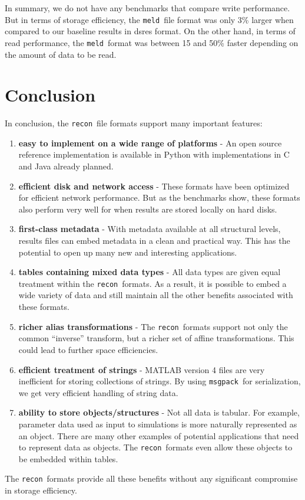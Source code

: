 \documentclass[11pt,a4paper,twocolumn]{article}
\newcommand{\recon}{\texttt{recon}}
\newcommand{\meld}{\texttt{meld}}
\newcommand{\msgpack}{\texttt{msgpack}}
\begin{document}
In summary, we do not have any benchmarks that compare write
performance.  But in terms of storage efficiency, the \meld\ file
format was only 3\% larger when compared to our baseline results in
dsres format.  On the other hand, in terms of read performance, the
\meld\ format was between 15 and 50\% faster depending on the amount
of data to be read.

\section{Conclusion}
\label{sec:conclusion}

In conclusion, the \recon\ file formats support many important features:
\begin{enumerate}
\item \textbf{easy to implement on a wide range of platforms} - An open
  source reference implementation is available in Python with
  implementations in C and Java already planned.
\item \textbf{efficient disk and network access} - These formats have been
  optimized for efficient network performance.  But as the benchmarks
  show, these formats also perform very well for when results are
  stored locally on hard disks.
\item \textbf{first-class metadata} - With metadata available at all
  structural levels, results files can embed metadata in a clean and
  practical way.  This has the potential to open up many new and
  interesting applications.
\item \textbf{tables containing mixed data types} - All data types are
  given equal treatment within the \recon\ formats.  As a result, it
  is possible to embed a wide variety of data and still maintain all
  the other benefits associated with these formats.
\item \textbf{richer alias transformations} - The \recon\ formats support
  not only the common ``inverse'' transform, but a richer set of
  affine transformations.  This could lead to further space
  efficiencies.
\item \textbf{efficient treatment of strings} - MATLAB version 4 files are
  very inefficient for storing collections of strings.  By using
  \msgpack\ for serialization, we get very efficient handling of
  string data.
\item \textbf{ability to store objects/structures} - Not all data is
  tabular.  For example, parameter data used as input to simulations
  is more naturally represented as an object.  There are many other
  examples of potential applications that need to represent data as
  objects.  The \recon\ formats even allow these objects to be
  embedded within tables.
\end{enumerate}

The \recon\ formats provide all these benefits without any significant
compromise in storage efficiency.

\printbibliography
\end{document}
